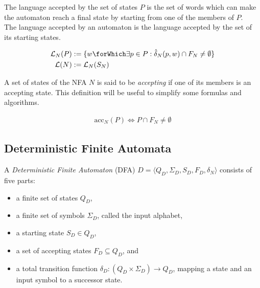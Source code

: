 \begin{definition}
  The language accepted by the set of states $P$ is the set of words which can
  make the automaton reach a final state by starting from one of the members
  of $P$.\\
  The language accepted by an automaton is the language accepted by the set of
  its starting states.

  \begin{align*}
    \mathcal{L}_N(P) &:= \{ w \forWhich \exists p \in P: \hat{\delta}_N(p, w) \cap F_N \neq \emptyset\}\\
    \mathcal{L}(N) &:= \mathcal{L}_N(S_N)
  \end{align*}
\end{definition}

\begin{definition}
  A set of states of the NFA $N$ is said to be \emph{accepting} if one of its
  members is an accepting state.
  This definition will be useful to simplify some formulas and algorithms.

  \begin{align*}
    \text{acc}_N(P) \iff P \cap F_N \neq \emptyset
  \end{align*}
\end{definition}

\subsection{Deterministic Finite Automata}

\begin{definition}
  A \emph{Deterministic Finite Automaton} (DFA)
  $D = \langle Q_D, \Sigma_D, S_D, F_D, \delta_N \rangle$
  consists of five parts:

  \begin{itemize}
    \item a finite set of states $Q_D$,
    \item a finite set of symbols $\Sigma_D$, called the input alphabet,
    \item a starting state $S_D \in Q_D$,
    \item a set of accepting states $F_D \subseteq Q_D$, and
    \item a total transition function
            $\delta_D : (Q_D \times \Sigma_D) \to Q_D$,
             mapping a state and an input symbol to a successor state.
  \end{itemize}

\end{definition}

